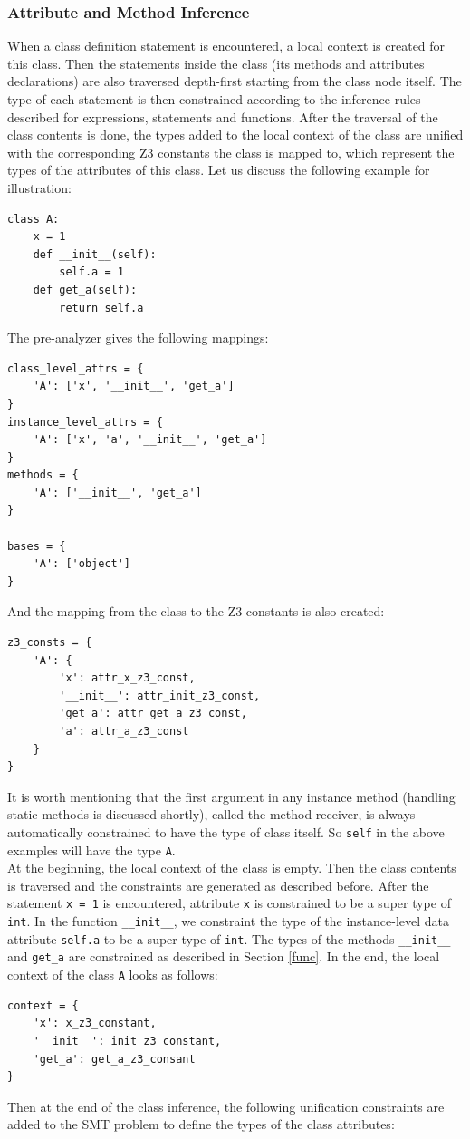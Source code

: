 \subsubsection{Attribute and Method Inference}
When a class definition statement is encountered, a local context is created for this class. Then the statements inside the class (its methods and attributes declarations) are also traversed depth-first starting from the class node itself. The type of each statement is then constrained according to the inference rules described for expressions, statements and functions. After the traversal of the class contents is done, the types added to the local context of the class are unified with the corresponding Z3 constants the class is mapped to, which represent the types of the attributes of this class. Let us discuss the following example for illustration:
\begin{lstlisting}
class A:
	x = 1
	def __init__(self):
		self.a = 1
	def get_a(self):
		return self.a
\end{lstlisting}
The pre-analyzer gives the following mappings:
\begin{lstlisting}
class_level_attrs = {
	'A': ['x', '__init__', 'get_a']
}
instance_level_attrs = {
	'A': ['x', 'a', '__init__', 'get_a']
}
methods = {
	'A': ['__init__', 'get_a']
}

bases = {
	'A': ['object']
}
\end{lstlisting}
And the mapping from the class to the Z3 constants is also created:

\begin{lstlisting}
z3_consts = {
	'A': {
		'x': attr_x_z3_const,
		'__init__': attr_init_z3_const,
		'get_a': attr_get_a_z3_const,
		'a': attr_a_z3_const
	}
}
\end{lstlisting}
It is worth mentioning that the first argument in any instance method (handling static methods is discussed shortly), called the method receiver, is always automatically constrained to have the type of class itself. So \lstinline|self| in the above examples will have the type \lstinline|A|. \\

At the beginning, the local context of the class is empty. Then the class contents is traversed and the constraints are generated as described before. After the statement \lstinline|x = 1| is encountered, attribute \lstinline|x| is constrained to be a super type of \lstinline|int|. In the function \lstinline|__init__|, we constraint the type of the instance-level data attribute \lstinline|self.a| to be a super type of \lstinline|int|. The types of the methods \lstinline|__init__| and \lstinline|get_a| are constrained as described in Section \ref{func}. In the end, the local context of the class \lstinline|A| looks as follows:
\begin{lstlisting}
context = {
	'x': x_z3_constant,
	'__init__': init_z3_constant,
	'get_a': get_a_z3_consant
}
\end{lstlisting}
Then at the end of the class inference, the following unification constraints are added to the SMT problem to define the types of the class attributes:

